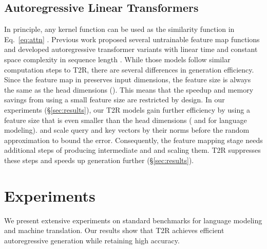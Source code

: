 \documentclass[11pt]{article}
\newcommand{\TRNN}{T2R\xspace}
\begin{document}
\subsection{Autoregressive Linear Transformers}
\label{sec:linear_transformers}
In principle, any kernel function can be used as the similarity function in Eq.\ \ref{eq:attn} \cite{tsai-etal-2019-transformer}.
Previous work proposed several untrainable feature map functions  and developed autoregressive transformer variants with linear time and constant space complexity in sequence length \cite{katharopoulos-et-al-2020, RFA, performer}.
While those models follow similar computation steps to \TRNN, there are several differences in generation efficiency.
Since the feature map in \citet{katharopoulos-et-al-2020} preserves input dimensions, the feature size is always the same as the head dimensions ().
This means that the speedup and memory savings from using a small feature size are restricted by design.
In our experiments (\S\ref{sec:results}), our \TRNN models gain further efficiency by using a feature size that is even smaller than the head dimensions ( and  for language modeling).
\citet{RFA} and \citet{performer} scale query and key vectors by their norms before the random approximation to bound the error.
Consequently, the feature mapping stage needs additional steps of producing intermediate  and  and scaling them.
\TRNN suppresses these steps and speeds up generation further (\S\ref{sec:results}).









\section{Experiments}
\label{sec:experiments}
We present extensive experiments on standard benchmarks for language modeling and machine translation.
Our results show that \TRNN achieves efficient autoregressive generation while retaining high accuracy.
\end{document}
